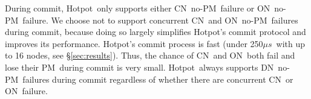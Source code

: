 \documentclass[sigconf]{acmart}
\newcommand{\DIFdelFL}[1]{}
\newcommand{\mus}{\mbox{$\mu s$}}
\newcommand{\nvm}{PM}
\newcommand{\hotpot}{Hotpot}
\newcommand{\on}{ON}
\newcommand{\dn}{DN}
\newcommand{\xn}{CN}
\providecommand{\DIFdel}[1]{{\protect\color{red}\sout{#1}}}                      %
\providecommand{\DIFdelbegin}{} %
\providecommand{\DIFdelFL}[1]{\DIFdel{#1}} %
\begin{document}
{During commit, \hotpot\ only supports either \xn\ no-\nvm\ failure or \on\ no-\nvm\ failure.
We choose not to support concurrent \xn\ and \on\ no-\nvm\ failures during commit,
because doing so largely simplifies \hotpot's commit protocol and improves its performance.
\hotpot's commit process is fast (under 250\mus\ with up to 16 nodes, see \S\ref{sec:results}).
Thus, the chance of \xn\ and \on\ both fail and lose their \nvm\ during commit is very small.
\hotpot\ always supports \dn\ no-\nvm\ failures during commit regardless of whether there are concurrent \xn\ or \on\ failure.


\DIFdelbegin %
\DIFdelFL{Workload }%
\DIFdelFL{Read }%
\DIFdelFL{Update }%
\DIFdelFL{Scan }%
\DIFdelFL{Insert }%
\DIFdelFL{R\&U }%
\DIFdelFL{A }%
\DIFdelFL{50\% }%
\DIFdelFL{50\% }%
\DIFdelFL{- }%
\DIFdelFL{- }%
\DIFdelFL{- }%
\DIFdelFL{B }%
\DIFdelFL{95\% }%
\DIFdelFL{5\% }%
\DIFdelFL{- }%
\DIFdelFL{- }%
\DIFdelFL{- }%
\DIFdelFL{C }%
\DIFdelFL{100\% }%
\DIFdelFL{- }%
\DIFdelFL{- }%
\DIFdelFL{- }%
\DIFdelFL{- }%
\DIFdelFL{D }%
\DIFdelFL{95\% }%
\DIFdelFL{- }%
\DIFdelFL{- }%
\DIFdelFL{5\% }%
\DIFdelFL{- }%
\DIFdelFL{E }%
}
\end{document}
